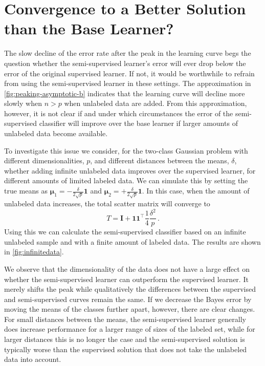 \documentclass[twoside]{memoir}\usepackage[]{graphicx}\usepackage{xcolor}
\renewcommand{\vec}{\mathbf}
\begin{document}
\section{Convergence to a Better Solution than the Base Learner?} \label{section:decline}

The slow decline of the error rate after the peak in the learning curve begs the question whether the semi-supervised learner's error will ever drop below the error of the original supervised learner. If not, it would be worthwhile to refrain from using the semi-supervised learner in these settings.  The approximation in \cref{fig:peaking-asymptotic-b} indicates that the learning curve will decline more slowly when $n>p$ when unlabeled data are added. From this approximation, however, it is not clear if and under which circumstances the error of the semi-supervised classifier will improve over the base learner if larger amounts of unlabeled data become available.

To investigate this issue we consider, for the two-class Gaussian problem with different dimensionalities, $p$, and different distances between the means, $\delta$, whether adding infinite unlabeled data improves over the supervised learner, for different amounts of limited labeled data. We can simulate this by setting the true means as $\boldsymbol{\mu}_1=-\tfrac{\delta}{2 \sqrt{p}}\vec{1}$ and $\boldsymbol{\mu}_2=+\tfrac{\delta}{2 \sqrt{p}}\vec{1}$. In this case, when the amount of unlabeled data increases, the total scatter matrix will converge to
$$
T = \vec{I} + \vec{1} \vec{1}^\top \frac{1}{4} \frac{\delta^2}{p} \,.
$$
Using this we can calculate the semi-supervised classifier based on an infinite unlabeled sample and with a finite amount of labeled data. The results are shown in \cref{fig:infinitedata}.

We observe that the dimensionality of the data does not have a large effect on whether the semi-supervised learner can outperform the supervised learner. It merely shifts the peak while qualitatively the differences between the supervised and semi-supervised curves remain the same. If we decrease the Bayes error by moving the means of the classes further apart, however, there are clear changes. For small distances between the means, the semi-supervised learner generally does increase performance for a larger range of sizes of the labeled set, while for larger distances this is no longer the case and the semi-supervised solution is typically worse than the supervised solution that does not take the unlabeled data into account.
\end{document}
